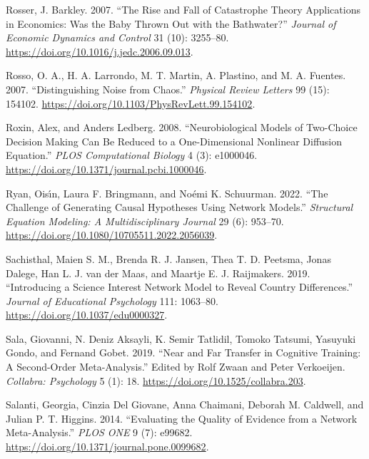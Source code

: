 \documentclass[
  a4paper,
  DIV=11,
  numbers=noendperiod,
  oneside]{scrreprt}
\newlength{\cslhangindent}
\newenvironment{CSLReferences}[2] %
 {\begin{list}{}{%
  \setlength{\itemindent}{0pt}
  \setlength{\leftmargin}{0pt}
  \setlength{\parsep}{0pt}
  \ifodd #1
   \setlength{\leftmargin}{\cslhangindent}
   \setlength{\itemindent}{-1\cslhangindent}
  \fi
  \setlength{\itemsep}{#2\baselineskip}}}
 {\end{list}}
\begin{document}
\begin{CSLReferences}{1}{0}
Rosser, J. Barkley. 2007. {``The Rise and Fall of Catastrophe Theory
Applications in Economics: {Was} the Baby Thrown Out with the
Bathwater?''} \emph{Journal of Economic Dynamics and Control} 31 (10):
3255--80. \url{https://doi.org/10.1016/j.jedc.2006.09.013}.

Rosso, O. A., H. A. Larrondo, M. T. Martin, A. Plastino, and M. A.
Fuentes. 2007. {``Distinguishing Noise from Chaos.''} \emph{Physical
Review Letters} 99 (15): 154102.
\url{https://doi.org/10.1103/PhysRevLett.99.154102}.

Roxin, Alex, and Anders Ledberg. 2008. {``Neurobiological {Models} of
{Two-Choice Decision Making Can Be Reduced} to a {One-Dimensional
Nonlinear Diffusion Equation}.''} \emph{PLOS Computational Biology} 4
(3): e1000046. \url{https://doi.org/10.1371/journal.pcbi.1000046}.

Ryan, Oisı́n, Laura F. Bringmann, and Noémi K. Schuurman. 2022. {``The
{Challenge} of {Generating Causal Hypotheses Using Network Models}.''}
\emph{Structural Equation Modeling: A Multidisciplinary Journal} 29 (6):
953--70. \url{https://doi.org/10.1080/10705511.2022.2056039}.

Sachisthal, Maien S. M., Brenda R. J. Jansen, Thea T. D. Peetsma, Jonas
Dalege, Han L. J. van der Maas, and Maartje E. J. Raijmakers. 2019.
{``Introducing a Science Interest Network Model to Reveal Country
Differences.''} \emph{Journal of Educational Psychology} 111: 1063--80.
\url{https://doi.org/10.1037/edu0000327}.

Sala, Giovanni, N. Deniz Aksayli, K. Semir Tatlidil, Tomoko Tatsumi,
Yasuyuki Gondo, and Fernand Gobet. 2019. {``Near and {Far Transfer} in
{Cognitive Training}: {A Second-Order Meta-Analysis}.''} Edited by Rolf
Zwaan and Peter Verkoeijen. \emph{Collabra: Psychology} 5 (1): 18.
\url{https://doi.org/10.1525/collabra.203}.

Salanti, Georgia, Cinzia Del Giovane, Anna Chaimani, Deborah M.
Caldwell, and Julian P. T. Higgins. 2014. {``Evaluating the Quality of
Evidence from a Network Meta-Analysis.''} \emph{PLOS ONE} 9 (7): e99682.
\url{https://doi.org/10.1371/journal.pone.0099682}.


\end{CSLReferences}
\end{document}
